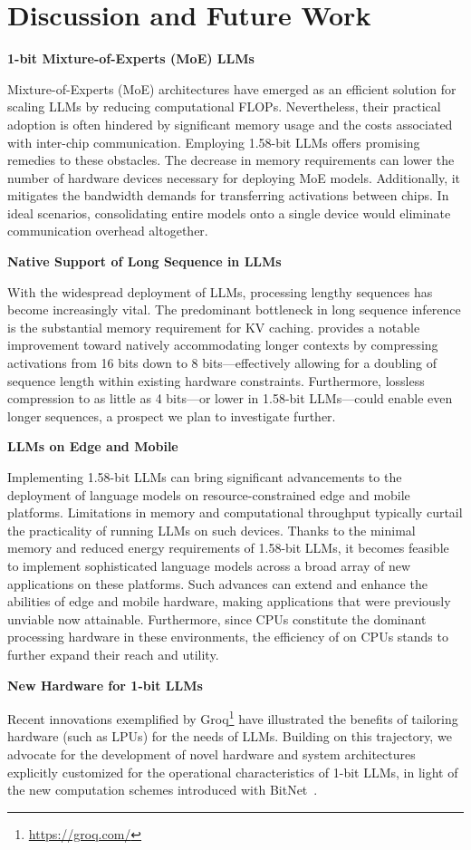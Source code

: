 \section{Discussion and Future Work}

\textbf{1-bit Mixture-of-Experts (MoE) LLMs}

Mixture-of-Experts (MoE) architectures have emerged as an efficient solution for scaling LLMs by reducing computational FLOPs. Nevertheless, their practical adoption is often hindered by significant memory usage and the costs associated with inter-chip communication. Employing 1.58-bit LLMs offers promising remedies to these obstacles. The decrease in memory requirements can lower the number of hardware devices necessary for deploying MoE models. Additionally, it mitigates the bandwidth demands for transferring activations between chips. In ideal scenarios, consolidating entire models onto a single device would eliminate communication overhead altogether.

\textbf{Native Support of Long Sequence in LLMs}

With the widespread deployment of LLMs, processing lengthy sequences has become increasingly vital. The predominant bottleneck in long sequence inference is the substantial memory requirement for KV caching.  provides a notable improvement toward natively accommodating longer contexts by compressing activations from 16 bits down to 8 bits—effectively allowing for a doubling of sequence length within existing hardware constraints. Furthermore, lossless compression to as little as 4 bits—or lower in 1.58-bit LLMs—could enable even longer sequences, a prospect we plan to investigate further.

\textbf{LLMs on Edge and Mobile}

Implementing 1.58-bit LLMs can bring significant advancements to the deployment of language models on resource-constrained edge and mobile platforms. Limitations in memory and computational throughput typically curtail the practicality of running LLMs on such devices. Thanks to the minimal memory and reduced energy requirements of 1.58-bit LLMs, it becomes feasible to implement sophisticated language models across a broad array of new applications on these platforms. Such advances can extend and enhance the abilities of edge and mobile hardware, making applications that were previously unviable now attainable. Furthermore, since CPUs constitute the dominant processing hardware in these environments, the efficiency of  on CPUs stands to further expand their reach and utility.

\textbf{New Hardware for 1-bit LLMs}

Recent innovations exemplified by Groq\footnote{\url{https://groq.com/}} have illustrated the benefits of tailoring hardware (such as LPUs) for the needs of LLMs. Building on this trajectory, we advocate for the development of novel hardware and system architectures explicitly customized for the operational characteristics of 1-bit LLMs, in light of the new computation schemes introduced with BitNet~\cite{bitnet}.